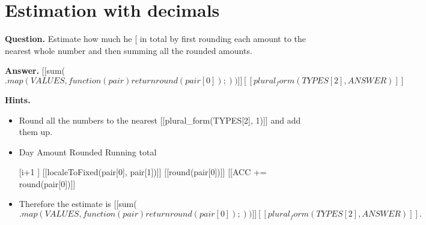 \documentclass{article}
\begin{document}
\section*{Estimation with decimals}
\textbf{Question.} Estimate how much he [ in total by first rounding each amount to the nearest whole number and then summing all the rounded amounts.

\textbf{Answer.} [[sum($.map(VALUES, function(pair) {
                    return round(pair[0]);
                }))]] [[plural_form(TYPES[2], ANSWER)]]$

\textbf{Hints.}
\begin{itemize}
  \item Round all the numbers to the nearest [[plural\_form(TYPES[2], 1)]] and add them up.
  \item Day
                    Amount
                    Rounded
                    Running total
  \item [[i+1]]
                    [[localeToFixed(pair[0], pair[1])]]
                    [[round(pair[0])]]
                    [[ACC += round(pair[0])]]
  \item Therefore the estimate is [[sum($.map(VALUES, function(pair) {
                    return round(pair[0]);
                }))]] [[plural_form(TYPES[2], ANSWER)]].$
\end{itemize}
\end{document}
